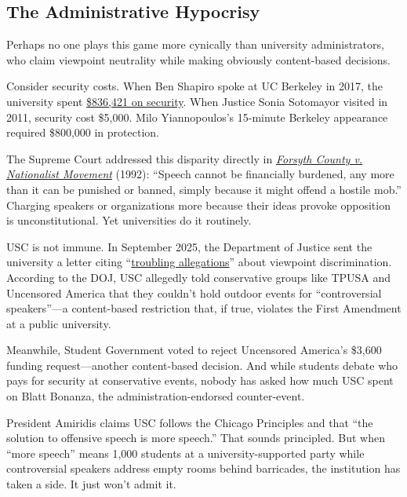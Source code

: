 \documentclass[11pt]{article}
\begin{document}
\subsection{The Administrative Hypocrisy}

Perhaps no one plays this game more cynically than university administrators, who claim viewpoint neutrality while making obviously content-based decisions.

Consider security costs. When Ben Shapiro spoke at UC Berkeley in 2017, the university spent \href{https://www.berkeleyside.org/2018/02/06/uc-berkeley-spent-close-4m-security-just-one-month-2017}{\$836,421 on security}. When Justice Sonia Sotomayor visited in 2011, security cost \$5,000. Milo Yiannopoulos's 15-minute Berkeley appearance required \$800,000 in protection.

The Supreme Court addressed this disparity directly in \href{https://supreme.justia.com/cases/federal/us/505/123/}{\textit{Forsyth County v. Nationalist Movement}} (1992): ``Speech cannot be financially burdened, any more than it can be punished or banned, simply because it might offend a hostile mob.'' Charging speakers or organizations more because their ideas provoke opposition is unconstitutional. Yet universities do it routinely.

USC is not immune. In September 2025, the Department of Justice sent the university a letter citing ``\href{https://www.postandcourier.com/education-lab/usc-doj-charlie-kirk-outdoor-event-controversial/article_c1d6ca0b-1173-403d-bd16-6f8fec66f748.html}{troubling allegations}'' about viewpoint discrimination. According to the DOJ, USC allegedly told conservative groups like TPUSA and Uncensored America that they couldn't hold outdoor events for ``controversial speakers''---a content-based restriction that, if true, violates the First Amendment at a public university.

Meanwhile, Student Government voted to reject Uncensored America's \$3,600 funding request---another content-based decision. And while students debate who pays for security at conservative events, nobody has asked how much USC spent on Blatt Bonanza, the administration-endorsed counter-event.

President Amiridis claims USC follows the Chicago Principles and that ``the solution to offensive speech is more speech.'' That sounds principled. But when ``more speech'' means 1,000 students at a university-supported party while controversial speakers address empty rooms behind barricades, the institution has taken a side. It just won't admit it.
\end{document}
